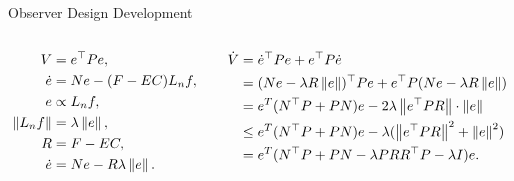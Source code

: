 \begin{slide}{Observer Design Development}
  \begin{columns}[c]
    \begin{column}{0.55\textwidth}
      \begin{align}
        V             & = e^{\top}Pe,          \\
        \dot{e}       & = Ne-(F-EC)L_{n}f,     \\
        e             & \propto L_{n}f,        \\
        \left\lVert L_{n}f\right\rVert & = \lambda{}\left\lVert e\right\rVert,   \\
        R             & = F-EC,                \\
        \dot{e}       & = Ne-R\lambda\left\lVert e\right\rVert.
      \end{align}
    \end{column}%
    \hfill%
    \begin{column}{0.55\textwidth}
      \begin{align}
        \begin{split}
          \dot{V} & = \dot{e}^{\top}Pe + e^{\top}P\dot{e}                                     \\
          & = (Ne-\lambda{}R\left\lVert e\right\rVert)^{\top}Pe + e^{\top}P(Ne-\lambda{}R\left\lVert e\right\rVert)     \\
          & = e^{T}(N^{\top}P + PN)e - 2\lambda\left\lVert e^{\top}PR\right\rVert\cdot\left\lVert e\right\rVert         \\
          & \leq e^{T}(N^{\top}P + PN)e - \lambda(\left\lVert e^{\top}PR\right\rVert^{2}+\left\lVert e\right\rVert^{2}) \\
          & = e^{T}(N^{\top}P + PN - \lambda{}PRR^{\top}P - \lambda{}I)e.
        \end{split}
      \end{align}
    \end{column}%
  \end{columns}
\end{slide}

